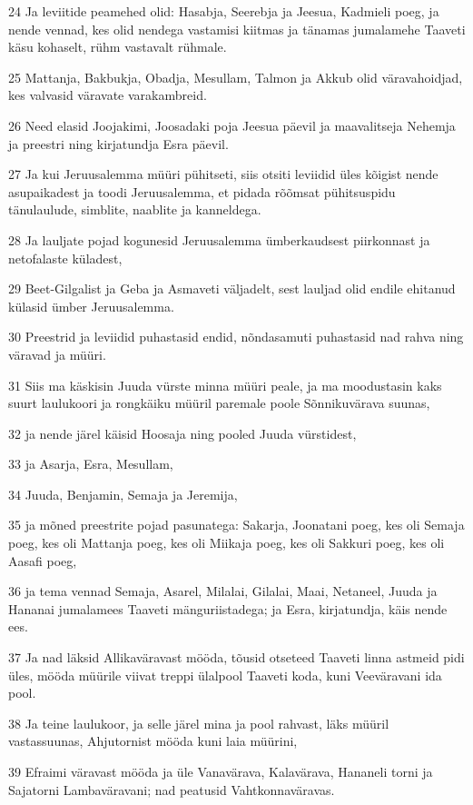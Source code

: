 \par 24 Ja leviitide peamehed olid: Hasabja, Seerebja ja Jeesua, Kadmieli poeg, ja nende vennad, kes olid nendega vastamisi kiitmas ja tänamas jumalamehe Taaveti käsu kohaselt, rühm vastavalt rühmale.
\par 25 Mattanja, Bakbukja, Obadja, Mesullam, Talmon ja Akkub olid väravahoidjad, kes valvasid väravate varakambreid.
\par 26 Need elasid Joojakimi, Joosadaki poja Jeesua päevil ja maavalitseja Nehemja ja preestri ning kirjatundja Esra päevil.
\par 27 Ja kui Jeruusalemma müüri pühitseti, siis otsiti leviidid üles kõigist nende asupaikadest ja toodi Jeruusalemma, et pidada rõõmsat pühitsuspidu tänulaulude, simblite, naablite ja kanneldega.
\par 28 Ja lauljate pojad kogunesid Jeruusalemma ümberkaudsest piirkonnast ja netofalaste küladest,
\par 29 Beet-Gilgalist ja Geba ja Asmaveti väljadelt, sest lauljad olid endile ehitanud külasid ümber Jeruusalemma.
\par 30 Preestrid ja leviidid puhastasid endid, nõndasamuti puhastasid nad rahva ning väravad ja müüri.
\par 31 Siis ma käskisin Juuda vürste minna müüri peale, ja ma moodustasin kaks suurt laulukoori ja rongkäiku müüril paremale poole Sõnnikuvärava suunas,
\par 32 ja nende järel käisid Hoosaja ning pooled Juuda vürstidest,
\par 33 ja Asarja, Esra, Mesullam,
\par 34 Juuda, Benjamin, Semaja ja Jeremija,
\par 35 ja mõned preestrite pojad pasunatega: Sakarja, Joonatani poeg, kes oli Semaja poeg, kes oli Mattanja poeg, kes oli Miikaja poeg, kes oli Sakkuri poeg, kes oli Aasafi poeg,
\par 36 ja tema vennad Semaja, Asarel, Milalai, Gilalai, Maai, Netaneel, Juuda ja Hananai jumalamees Taaveti mänguriistadega; ja Esra, kirjatundja, käis nende ees.
\par 37 Ja nad läksid Allikaväravast mööda, tõusid otseteed Taaveti linna astmeid pidi üles, mööda müürile viivat treppi ülalpool Taaveti koda, kuni Veeväravani ida pool.
\par 38 Ja teine laulukoor, ja selle järel mina ja pool rahvast, läks müüril vastassuunas, Ahjutornist mööda kuni laia müürini,
\par 39 Efraimi väravast mööda ja üle Vanavärava, Kalavärava, Hananeli torni ja Sajatorni Lambaväravani; nad peatusid Vahtkonnaväravas.
